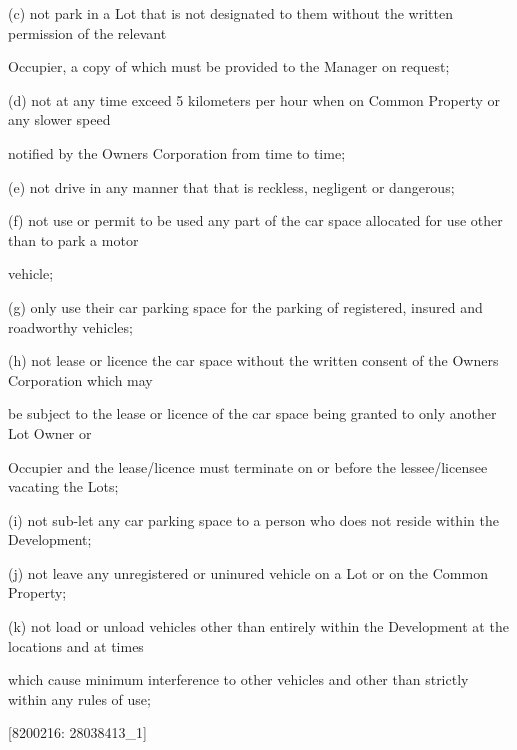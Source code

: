 \documentclass{article}
\begin{document}
{\fontsize{9.962}{1}(c) not park in a Lot that is not designated to them without the written permission of the relevant }

{\fontsize{10.02}{1}Occupier, a copy of which must be provided to the Manager on request; }

{\fontsize{9.962}{1}(d) not at any time exceed 5 kilometers per hour when on Common Property or any slower speed }

{\fontsize{10.02}{1}notified by the Owners Corporation from time to time; }

{\fontsize{9.962}{1}(e) not drive in any manner that that is reckless, negligent or dangerous; }

{\fontsize{9.962}{1}(f) not use or permit to be used any part of the car space allocated for use other than to park a motor }

{\fontsize{10.02}{1}vehicle; }

{\fontsize{9.962}{1}(g) only use their car parking space for the parking of registered, insured and roadworthy vehicles; }

{\fontsize{9.962}{1}(h) not lease or licence the car space without the written consent of the Owners Corporation which may }

{\fontsize{10.02}{1}be subject to the lease or licence of the car space being granted to only another Lot Owner or }

{\fontsize{10.02}{1}Occupier and the lease/licence must terminate on or before the lessee/licensee vacating the Lots; }

{\fontsize{9.962}{1}(i) not sub-let any car parking space to a person who does not reside within the Development; }

{\fontsize{9.962}{1}(j) not leave any unregistered or uninured vehicle on a Lot or on the Common Property; }

{\fontsize{9.962}{1}(k) not load or unload vehicles other than entirely within the Development at the locations and at times }

{\fontsize{10.02}{1}which cause minimum interference to other vehicles and other than strictly within any rules of use; }

\newpage
















{\fontsize{7.02}{1}[8200216: 28038413\_1] }
\end{document}
